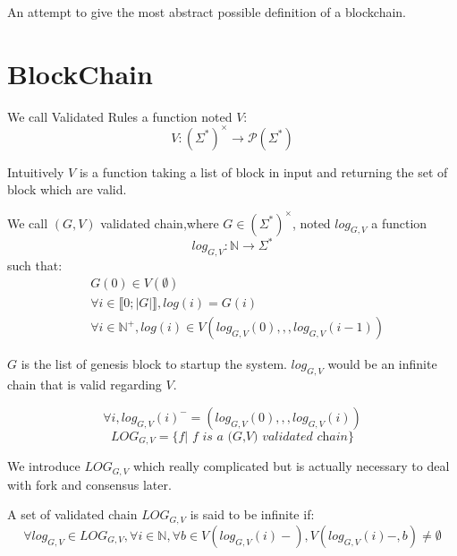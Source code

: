 
An attempt to give the most abstract possible definition of a blockchain.

\section{BlockChain}

\begin{mydef}
	We call Validated Rules a function noted $V$:
	$$V : (\Sigma^*)^\times \rightarrow \mathscr{P}(\Sigma^*)$$
\end{mydef}

\begin{myrem}
	Intuitively $V$ is a function taking a list of block in input and returning the set of block which are valid.
\end{myrem}

\begin{mydef}
	We call $(G,V)$ validated chain,where $G \in (\Sigma^*)^\times$, noted $log_{G,V}$ a function 
	$$log_{G,V}: \mathbb{N} \rightarrow \Sigma^*$$
	such that:
	\begin{align*}
	&G(0) \in V(\emptyset) \\
	&\forall i \in \llbracket 0;|G|\rrbracket, log(i) = G(i) \\
	&\forall i \in \mathbb{N}^+ , log(i) \in V(log_{G,V}(0),,,log_{G,V}(i-1)) 
	\end{align*}
\end{mydef}

\begin{myrem}
	$G$ is the list of genesis block to startup the system. $log_{G,V}$ would be an infinite chain that is valid regarding $V$.
\end{myrem}

\begin{mynota}
	$$\forall i , log_{G,V}(i)^- = (log_{G,V}(0),,,log_{G,V}(i))$$
	$$LOG_{G,V} = \{ f | \textit{ f is a (G,V) validated chain}\}$$
\end{mynota}

\begin{myrem}
	We introduce $LOG_{G,V}$ which really complicated but is actually necessary to deal with fork and consensus later.
\end{myrem}

\begin{mydef}
	A set of validated chain $LOG_{G,V}$ is said to be infinite if:
	$$\forall log_{G,V} \in LOG_{G,V}, \forall i \in \mathbb{N} , \forall b  \in V(log_{G,V}(i)-), V(log_{G,V}(i)-,b)\neq \emptyset $$
\end{mydef}

